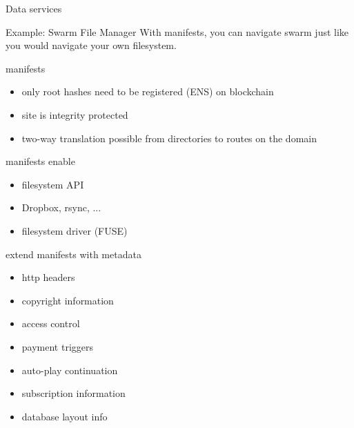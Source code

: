 \documentclass{beamer}
\begin{document}
\begin{section}{Data services}
 \begin{frame}{Example: Swarm File Manager}
  With manifests, you can navigate swarm just like you would navigate your own filesystem.\\
 \end{frame}

\begin{frame}{}
\begin{block}{manifests}
\begin{itemize}
 \item only root hashes need to be registered (ENS) on blockchain
 \item site is integrity protected
 \item two-way translation possible from directories to routes on the domain
  \end{itemize}
\end{block}
\begin{block}{manifests enable}
  \begin{itemize}
   \item filesystem API
   \item Dropbox, rsync, ...
   \item filesystem driver (FUSE)
  \end{itemize}
  \end{block}
\end{frame}


\begin{frame}{}
\begin{block}{extend manifests with metadata}
\begin{itemize}
      \item http headers
      \item copyright information
      \item access control
      \item payment triggers
      \item auto-play continuation
      \item subscription information
      \item database layout info
\end{itemize}
\end{block}



\end{frame}
\end{section}
\end{document}
